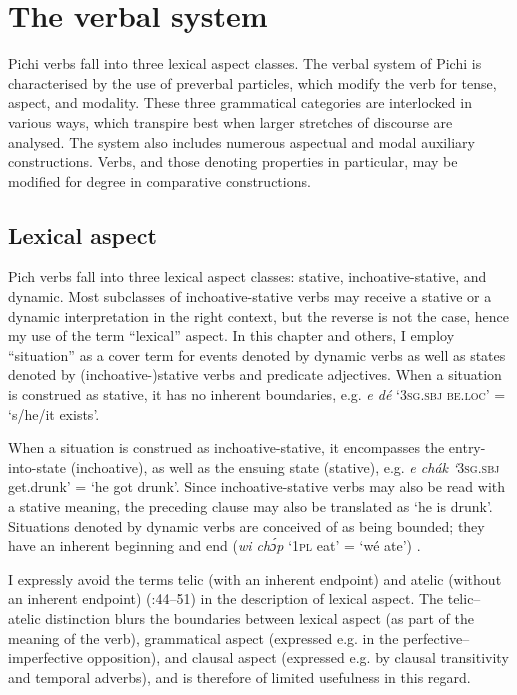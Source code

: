 \chapter{The verbal system}

Pichi verbs fall into three lexical aspect classes. The verbal system of Pichi is characterised by the use of preverbal particles, which modify the verb for tense, aspect, and modality. These three grammatical categories are interlocked in various ways, which transpire best when larger stretches of discourse are analysed. The system also includes numerous aspectual and modal auxiliary constructions. Verbs, and those denoting properties in particular, may be modified for degree in comparative constructions.

\section{Lexical aspect}\label{sec:6.1}

Pich verbs fall into three lexical aspect classes: stative, inchoative-stative, and dynamic. Most subclasses of inchoative-stative verbs may receive a stative or a dynamic interpretation in the right context, but the reverse is not the case, hence my use of the term “lexical” aspect. In this chapter and others, I employ “situation” as a cover term for events denoted by dynamic verbs as well as states denoted by (inchoative-)stative verbs and predicate adjectives. When a situation is construed as stative, it has no inherent boundaries, e.g. \textit{e dé} ‘\textsc{3sg.sbj} \textsc{be.loc}’ = ‘s/he/it exists’. 


When a situation is construed as inchoative-stative, it encompasses the entry-into-state (inchoative), as well as the ensuing state (stative), e.g. \textit{e chák ‘}\textsc{3sg.sbj} get.drunk’ = ‘he got drunk’. Since inchoative-stative verbs may also be read with a stative meaning, the preceding clause may also be translated as ‘he is drunk’. Situations denoted by dynamic verbs are conceived of as being bounded; they have an inherent beginning and end (\textit{wi chɔ́p} ‘\textsc{1pl} eat’ = ‘wé ate’) \citep{Sasse1991}.



I expressly avoid the terms telic (with an inherent endpoint) and atelic (without an inherent endpoint) (\citealt{Comrie1976}:44–51) in the description of lexical aspect. The telic–atelic distinction blurs the boundaries between lexical aspect (as part of the meaning of the verb), grammatical aspect (expressed e.g. in the perfective–imperfective opposition), and clausal aspect (expressed e.g. by clausal transitivity and temporal adverbs), and is therefore of limited usefulness in this regard. 



